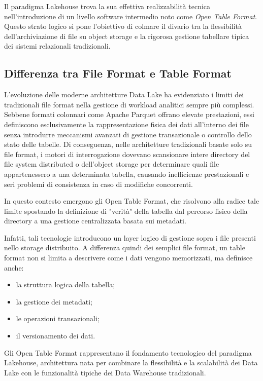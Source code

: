 \documentclass[12pt,a4paper,openright,twoside]{book}
\begin{document}
Il paradigma Lakehouse trova la sua effettiva realizzabilità tecnica nell'introduzione di un livello software intermedio noto come \textit{Open Table Format}. 
Questo strato logico si pone l'obiettivo di colmare il divario tra la flessibilità dell'archiviazione di file su object storage e la rigorosa gestione tabellare tipica dei sistemi relazionali tradizionali.

\subsection{Differenza tra File Format e Table Format}
L'evoluzione delle moderne architetture Data Lake ha evidenziato i limiti dei tradizionali file format nella gestione di workload analitici sempre più complessi.
Sebbene formati colonnari come Apache Parquet offrano elevate prestazioni, essi definiscono esclusivamente la rappresentazione fisica dei dati all'interno dei file senza introdurre meccanismi avanzati di gestione transazionale o controllo dello stato delle tabelle.
Di conseguenza, nelle architetture tradizionali basate solo su file format, i motori di interrogazione dovevano scansionare intere directory del file system distributed o dell'object storage per determinare quali file appartenessero a una determinata tabella, causando inefficienze prestazionali e seri problemi di consistenza in caso di modifiche concorrenti.

In questo contesto emergono gli Open Table Format, che risolvono alla radice tale limite spostando la definizione di "verità" della tabella dal percorso fisico della directory a una gestione centralizzata basata sui metadati.

Infatti, tali tecnologie introducono un layer logico di gestione sopra i file presenti nello storage distribuito. A differenza quindi dei semplici file format, un table format non si limita a descrivere come i dati vengono memorizzati, ma definisce anche:
\begin{itemize}
    \item la struttura logica della tabella;
    \item la gestione dei metadati;
    \item le operazioni transazionali;
    \item il versionamento dei dati.
\end{itemize}

Gli Open Table Format rappresentano il fondamento tecnologico del paradigma Lakehouse, architettura nata per combinare la flessibilità e la scalabilità dei Data Lake con le funzionalità tipiche dei Data Warehouse tradizionali. \cite{armbrust2021lakehouse}
\end{document}
